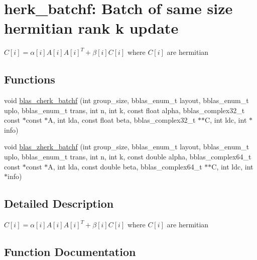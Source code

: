 \hypertarget{group__herk__batchf}{}\section{herk\+\_\+batchf\+: Batch of same size hermitian rank k update}
\label{group__herk__batchf}


$ C[i] = \alpha[i] A[i] A[i]^T + \beta[i] C[i] $ where $ C[i] $ are hermitian  


\subsection*{Functions}
\begin{DoxyCompactItemize}
\item 
void \mbox{\hyperlink{group__herk__batchf_ga8aad74b7ecbc7e716ee23897487d4f98}{blas\+\_\+cherk\+\_\+batchf}} (int group\+\_\+size, bblas\+\_\+enum\+\_\+t layout, bblas\+\_\+enum\+\_\+t uplo, bblas\+\_\+enum\+\_\+t trans, int n, int k, const float alpha, bblas\+\_\+complex32\+\_\+t const $\ast$const $\ast$A, int lda, const float beta, bblas\+\_\+complex32\+\_\+t $\ast$$\ast$C, int ldc, int $\ast$info)
\item 
void \mbox{\hyperlink{group__herk__batchf_gaa1e04011e03eea04e15c9e8b083a7388}{blas\+\_\+zherk\+\_\+batchf}} (int group\+\_\+size, bblas\+\_\+enum\+\_\+t layout, bblas\+\_\+enum\+\_\+t uplo, bblas\+\_\+enum\+\_\+t trans, int n, int k, const double alpha, bblas\+\_\+complex64\+\_\+t const $\ast$const $\ast$A, int lda, const double beta, bblas\+\_\+complex64\+\_\+t $\ast$$\ast$C, int ldc, int $\ast$info)
\end{DoxyCompactItemize}


\subsection{Detailed Description}
$ C[i] = \alpha[i] A[i] A[i]^T + \beta[i] C[i] $ where $ C[i] $ are hermitian 



\subsection{Function Documentation}
\mbox{\label{group__herk__batchf_ga8aad74b7ecbc7e716ee23897487d4f98}} 
